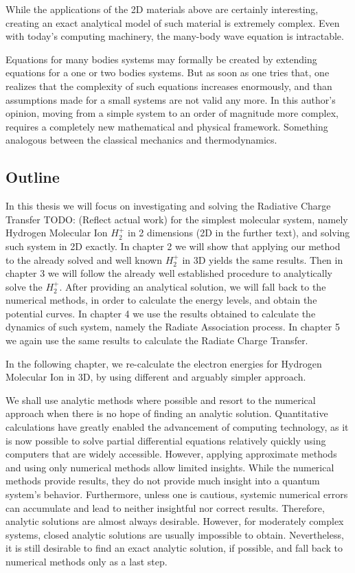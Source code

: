 While the applications of the 2D materials above are certainly interesting, creating an exact analytical  model of such material is extremely complex. Even with today's computing machinery, the many-body wave equation is intractable.  

Equations for many bodies systems may formally be created by extending equations for a one or two bodies systems. But as soon as one tries that, one realizes that the complexity of such equations increases enormously, and than assumptions  made for a small systems are not valid any more. In this author's opinion, moving from a simple system to an order of magnitude more complex, requires a completely new mathematical and physical framework. Something analogous between the classical mechanics and thermodynamics.

\subsection*{Outline}
In this thesis we will focus on investigating and solving the Radiative Charge Transfer TODO: (Reflect actual work) for the simplest molecular system, namely Hydrogen Molecular Ion $ {H_2^{+}}  $ in 2 dimensions (2D in the further text), and solving such system in 2D exactly.  In chapter 2 we will show that applying our method to the already solved and well known $ {H_2^{+}} $ in 3D yields the same results. Then in chapter 3 we will follow  the already well established procedure \cite{Bates1} to analytically solve the $ {H_2^{+}} $. After providing an analytical solution, we will fall back to the numerical methods, in order to calculate the energy levels, and obtain the potential curves. In chapter 4  we use the results obtained to calculate the dynamics of such system, namely the Radiate Association process. In chapter 5 we again use the same results to calculate the Radiate Charge Transfer. 

In the following chapter, we re-calculate the electron energies for Hydrogen Molecular Ion in 3D, by using different and arguably simpler approach.

We shall use analytic methods where possible and resort to the numerical approach when there is no hope of finding an analytic solution.
Quantitative calculations have greatly enabled the advancement of computing technology, as it is now possible to solve partial differential equations relatively quickly using computers that are widely accessible.  However, applying approximate methods and using only numerical methods allow limited insights. While the numerical methods provide results, they do not provide much insight into a quantum system's behavior. Furthermore, unless one is cautious, systemic numerical errors can accumulate and lead to neither insightful nor correct results. Therefore, analytic solutions are almost always desirable. However, for moderately complex systems, closed analytic solutions are usually impossible to obtain. Nevertheless, it is still desirable to find an exact analytic solution,  if possible, and fall back to numerical methods only as a last step. 